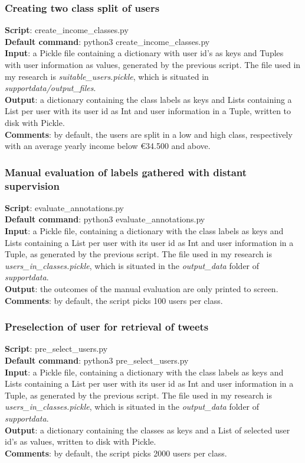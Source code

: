 \documentclass[
10pt, %
a4paper, %
oneside, %
headinclude,footinclude, %
] {book}%
\begin{document}
\subsubsection{Creating two class split of users}
\textbf{Script}:	create\_income\_classes.py \\
\textbf{Default command}: python3 create\_income\_classes.py\\
\textbf{Input}:  a Pickle file containing a dictionary with user id's as keys and Tuples with user information as values, generated by the previous script. The file used in my research is \textit{suitable\_users.pickle}, which is situated in \textit{supportdata/output\_files}. \\
\textbf{Output}:  a dictionary containing the class labels as keys and Lists containing a List per user with its
    user id as Int and user information in a Tuple, written to disk with Pickle.\\
\textbf{Comments}: by default, the users are split in a low and high class, respectively with an average yearly income below \euro 34.500 and above.

\subsubsection{Manual evaluation of labels gathered with distant supervision}
\textbf{Script}:	evaluate\_annotations.py \\
\textbf{Default command}: python3 evaluate\_annotations.py\\
\textbf{Input}:  a Pickle file, containing a dictionary with the class labels as keys and Lists containing a List per user with its
    user id as Int and user information in a Tuple, as generated by the previous script. The file used in my research is \textit{users\_in\_classes.pickle}, which is situated in the \textit{output\_data} folder of \textit{supportdata}. \\
\textbf{Output}:  the outcomes of the manual evaluation are only printed to screen. \\
\textbf{Comments}: by default, the script picks 100 users per class. 

\subsubsection{Preselection of user for retrieval of tweets}
\textbf{Script}:	pre\_select\_users.py \\
\textbf{Default command}: python3 pre\_select\_users.py\\
\textbf{Input}:  a Pickle file, containing a dictionary with the class labels as keys and Lists containing a List per user with its
    user id as Int and user information in a Tuple, as generated by the previous script. The file used in my research is \textit{users\_in\_classes.pickle}, which is situated in the \textit{output\_data} folder of \textit{supportdata}. \\
\textbf{Output}:  a dictionary containing the classes as keys and a List of selected user id's as values, written to disk with Pickle. \\
\textbf{Comments}: by default, the script picks 2000 users per class. 
\end{document}
